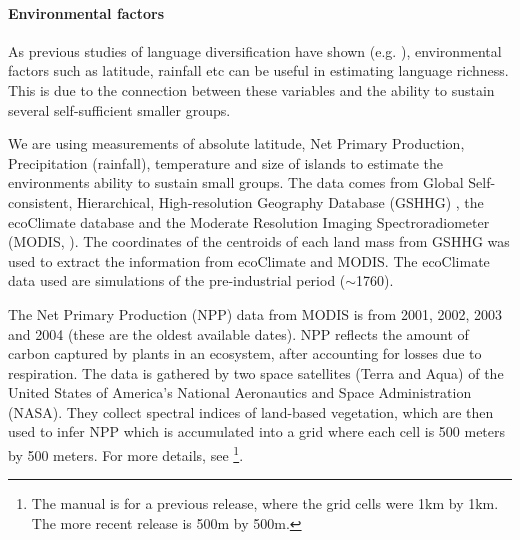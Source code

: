 \documentclass[unnumsec,webpdf,modern,medium]{oup-authoring-template}
\begin{document}
\FloatBarrier
\paragraph{Environmental factors} 
\label{appendix_environ}
As previous studies of language diversification have shown (e.g. \citet{ greenhill2015demographic, gavin2017process, Pacheco_Coelho_2019, hua2019ecological}), environmental factors such as latitude, rainfall etc can be useful in estimating language richness. This is due to the connection between these variables and the ability to sustain several self-sufficient smaller groups.


We are using measurements of absolute latitude, Net Primary Production, Precipitation (rainfall), temperature and size of islands to estimate the environments ability to sustain small groups. The data comes from Global Self-consistent, Hierarchical, High-resolution Geography Database (GSHHG) \citep{wessel1996global}, the ecoClimate database \citep{ecoclimate} and the Moderate Resolution Imaging Spectroradiometer (MODIS, \citet{running2021modis_terra, running2021modis_aqua}). The coordinates of the centroids of each land mass from GSHHG was used to extract the information from ecoClimate and MODIS. The ecoClimate data used are simulations of the pre-industrial period ($\sim$1760).

The Net Primary Production (NPP) data from MODIS is from 2001, 2002, 2003 and 2004 (these are the oldest available dates). NPP reflects the amount of carbon captured by plants in an ecosystem, after accounting for losses due to respiration. The data is gathered by two space satellites (Terra and Aqua) of the United States of America's National Aeronautics and Space Administration (NASA). They collect spectral indices of land-based vegetation, which are then used to infer NPP which is accumulated into a grid where each cell is 500 meters by 500 meters. For more details, see \citet{running2015daily} \footnote{The manual is for a previous release, where the grid cells were 1km by 1km. The more recent release is 500m by 500m.}.
\end{document}

